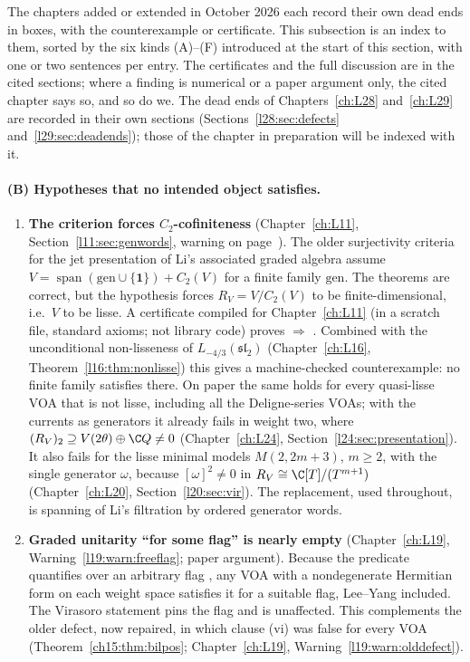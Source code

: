 The chapters added or extended in October 2026 each record their own dead ends in  boxes, with the
counterexample or certificate. This subsection is an index to them, sorted by the six kinds (A)--(F) introduced at the
start of this section, with one or two sentences per entry. The certificates and the full discussion are in the cited
sections; where a finding is numerical or a paper argument only, the cited chapter says so, and so do we. The dead
ends of Chapters~\ref{ch:L28} and~\ref{ch:L29} are recorded in their own sections
(Sections~\ref{l28:sec:defects} and~\ref{l29:sec:deadends}); those of the chapter in preparation will be indexed with it.

\paragraph{(B) Hypotheses that no intended object satisfies.}
\begin{enumerate}
\item \textbf{The  criterion forces $C_2$-cofiniteness} (Chapter~\ref{ch:L11},
  Section~\ref{l11:sec:genwords}, warning on page~\pageref{l11:warn:hdec}). The older surjectivity criteria for the jet
  presentation of Li's associated graded algebra assume
  $V=\operatorname{span}(\mathrm{gen}\cup\{\mathbf 1\})+C_2(V)$ for a finite family $\mathrm{gen}$. The theorems are
  correct, but the hypothesis forces $R_V=V/C_2(V)$ to be finite-dimensional, i.e.\ $V$ to be lisse. A certificate
  compiled for Chapter~\ref{ch:L11} (in a scratch file, standard axioms; not library code) proves
   $\Rightarrow$ . Combined with the unconditional non-lisseness of
  $L_{-4/3}(\mathfrak{sl}_2)$ (Chapter~\ref{ch:L16}, Theorem~\ref{l16:thm:nonlisse}) this gives a machine-checked
  counterexample: no finite family satisfies  there. On paper the same holds for every quasi-lisse VOA that is not
  lisse, including all the Deligne-series VOAs; with the currents as generators it already fails in weight two, where
  $(R_V)_2\supseteq V(2\theta)\oplus\C Q\neq0$ (Chapter~\ref{ch:L24}, Section~\ref{l24:sec:presentation}). It also fails for
  the lisse minimal models $M(2,2m+3)$, $m\ge2$, with the single generator $\omega$, because $[\omega]^2\neq0$ in
  $R_V\cong\C[T]/(T^{m+1})$ (Chapter~\ref{ch:L20}, Section~\ref{l20:sec:vir}). The replacement, used throughout, is
  spanning of Li's filtration by ordered generator words.
\item \textbf{Graded unitarity ``for some flag'' is nearly empty} (Chapter~\ref{ch:L19}, Warning~\ref{l19:warn:freeflag};
  paper argument). Because the predicate  quantifies over an arbitrary flag , any VOA with
  a nondegenerate Hermitian form on each weight space satisfies it for a suitable flag, Lee--Yang included. The Virasoro
  statement  pins the flag and is unaffected. This complements the older defect, now repaired, in
  which clause (vi) was false for every VOA (Theorem~\ref{ch15:thm:bilpos}; Chapter~\ref{ch:L19},
  Warning~\ref{l19:warn:olddefect}).
\end{enumerate}

